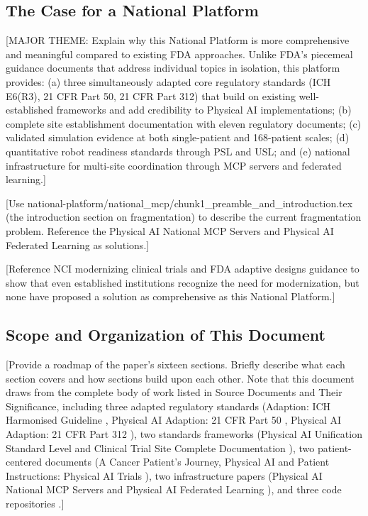 \subsection{The Case for a National Platform}
\label{subsec:case-national}

[MAJOR THEME: Explain why this National Platform is more comprehensive and
meaningful compared to existing FDA approaches. Unlike FDA's piecemeal guidance
documents that address individual topics in isolation, this platform provides:
(a) three simultaneously adapted core regulatory standards (ICH E6(R3), 21 CFR
Part 50, 21 CFR Part 312) that build on existing well-established frameworks
and add credibility to Physical AI implementations; (b) complete site
establishment documentation with eleven regulatory documents; (c) validated
simulation evidence at both single-patient and 168-patient scales;
(d) quantitative robot readiness standards through PSL and USL; and
(e) national infrastructure for multi-site coordination through MCP servers
and federated learning.]

[Use national-platform/national\_mcp/chunk1\_preamble\_and\_introduction.tex
(the introduction section on fragmentation) to describe the current
fragmentation problem. Reference the Physical AI National MCP Servers
\cite{national-mcp-paper} and Physical AI Federated Learning \cite{fl-paper}
as solutions.]

[Reference NCI modernizing clinical trials \cite{nci-modernizing} and FDA
adaptive designs guidance \cite{fda-adaptive-designs} to show that even
established institutions recognize the need for modernization, but none have
proposed a solution as comprehensive as this National Platform.]

\subsection{Scope and Organization of This Document}
\label{subsec:scope}

[Provide a roadmap of the paper's sixteen sections. Briefly describe what each
section covers and how sections build upon each other. Note that this document
draws from the complete body of work listed in Source Documents and Their
Significance, including three adapted regulatory standards (Adaption: ICH
Harmonised Guideline \cite{ich-adapt}, Physical AI Adaption: 21 CFR Part 50
\cite{cfr50-adapt}, Physical AI Adaption: 21 CFR Part 312 \cite{cfr312-adapt}),
two standards frameworks (Physical AI Unification Standard Level
\cite{usl-standard} and Clinical Trial Site Complete Documentation
\cite{site-docs}), two patient-centered documents (A Cancer Patient's Journey,
Physical AI \cite{patient-journey-paper} and Patient Instructions: Physical AI
Trials \cite{patient-instructions-paper}), two infrastructure papers (Physical
AI National MCP Servers \cite{national-mcp-paper} and Physical AI Federated
Learning \cite{fl-paper}), and three code repositories
\cite{main-repo, mcp-repo, fl-repo}.]

